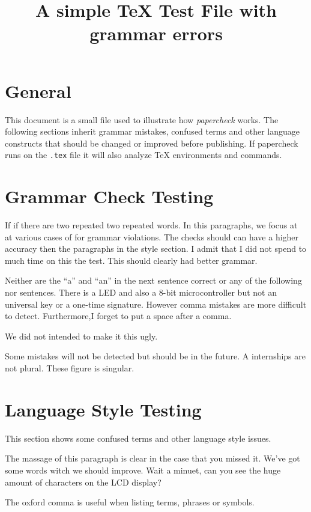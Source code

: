 \documentclass{scrartcl}
\title{A simple TeX Test File with grammar errors}
\begin{document}
\maketitle


\section{General}
This document is a small file used to illustrate how \emph{papercheck} works.
The following sections inherit grammar mistakes, confused terms and other language constructs that should be changed or improved before publishing.
If papercheck runs on the \verb!.tex! file it will also analyze TeX environments and commands.



\section{Grammar Check Testing}
If if there are 
two repeated two repeated words.
In this paragraphs, we focus at at various cases of for grammar violations.
The checks should can have a higher accuracy then the paragraphs in the style section.
I admit that I did not spend to much time on this the test.
This should clearly had better grammar.

Neither are the “a” and “an” in the next sentence correct or any of the following nor sentences.
There is a LED and also a 8-bit microcontroller but not an universal key or a one-time signature.
However comma mistakes are more difficult to detect.
Furthermore,I forget to put a space after a comma.

We did not intended to make it this ugly.

Some mistakes will not be detected but should be in the future.
A internships are not plural. These figure is singular.






\section{Language Style Testing}
This section shows some confused terms and other language style issues.

The massage of this paragraph is clear in the case that you missed it. We've got some words witch we should improve.
Wait a minuet, can you see the huge amount of characters on the LCD display? 

The oxford comma is useful when listing terms, phrases or symbols.
\end{document}
